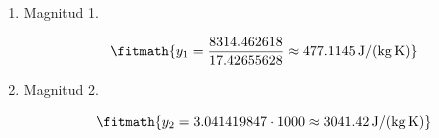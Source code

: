 \begin{enumerate}

\item Magnitud 1.

\[\fitmath{y_{1}=\frac{8314.462618}{17.42655628}\approx 477.1145\,\mathrm{J/(kg\,K)}}\]

\item Magnitud 2.

\[\fitmath{y_{2}=3.041419847\cdot 1000\approx 3041.42\,\mathrm{J/(kg\,K)}}\]

\end{enumerate}
